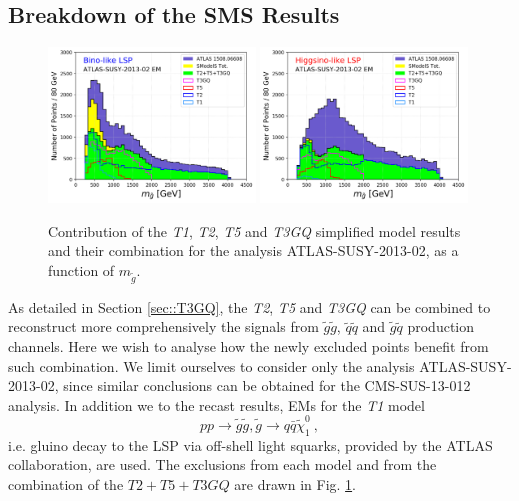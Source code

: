 \documentclass[a4paper,11pt]{article}
\newcommand{\MGLU}{$ m _{ \tilde g } $\xspace}
\begin{document}
\subsection{Breakdown of the SMS Results}
\begin{figure}
	\begin{center}
		\subfigure
		{\includegraphics[width=0.49\textwidth]{PLOTS/Combination/Bino_Con.png}}
		\subfigure
		{\includegraphics[width=0.49\textwidth]{PLOTS/Combination/Higgsino_Con.png}}
	\end{center}
	\caption{Contribution of the \textit{T1}, \textit{T2}, \textit{T5} and \textit{T3GQ} simplified model results and their combination for the analysis ATLAS-SUSY-2013-02, as a function of \MGLU.} 
	\label{sms-histo}
\end{figure}
As detailed in Section \ref{sec::T3GQ}, the \textit{T2}, \textit{T5} and \textit{T3GQ} can be combined to reconstruct more comprehensively the signals from $\tilde g \tilde g$, $\tilde q \tilde q$ and $\tilde g \tilde q$ production channels. Here we wish to analyse how the newly excluded points benefit from such combination. We limit ourselves to consider only the analysis ATLAS-SUSY-2013-02, since similar conclusions can be obtained for the CMS-SUS-13-012 analysis. In addition we to the recast results, EMs for the \textit{T1} model 
\begin{equation}
p p \rightarrow \tilde g \tilde g , \tilde g \rightarrow q \bar q \tilde \chi_1 ^0 \ , 
\end{equation}
i.e. gluino decay to the LSP via off-shell light squarks, provided by the ATLAS collaboration, are used. The exclusions from each model and from the combination of the $T2+T5+T3GQ$ are drawn in Fig. \ref{sms-histo}. 
\end{document}
